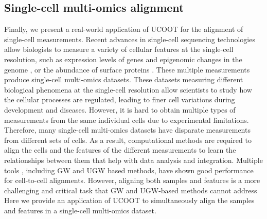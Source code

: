 \subsection{Single-cell multi-omics alignment}
Finally, we present a real-world application of UCOOT for the alignment of single-cell measurements.
Recent advances in single-cell sequencing technologies allow biologists to measure
a variety of cellular features at the single-cell resolution, such as expression levels of genes
and epigenomic changes in the genome \citep{Buenrostro15,Chen19},
or the abundance of surface proteins \citep{CITEseq}. These multiple measurements produce
single-cell multi-omics datasets. These datasets measuring different biological phenomena
at the single-cell resolution allow scientists to study how the cellular processes are regulated,
leading to finer cell variations during development and diseases. However, it is hard to obtain
multiple types of measurements from the same individual cells due to experimental limitations.
Therefore, many single-cell multi-omics datasets have disparate measurements from different
sets of cells. As a result, computational methods are required to align the cells and
the features of the different measurements to learn the relationships between them that help
with data analysis and integration. Multiple tools \citep{Pamona, Seurat, Liu2019},
including GW \citep{Pamona, Demetci22} and UGW \citep{Demetci22-2} based methods,
have shown good performance for cell-to-cell alignments.
However, aligning both samples and features is a more challenging and critical task that
GW and UGW-based methods cannot address
Here we provide an application of UCOOT to simultaneously align the samples and features
in a single-cell multi-omics dataset.
%
%

